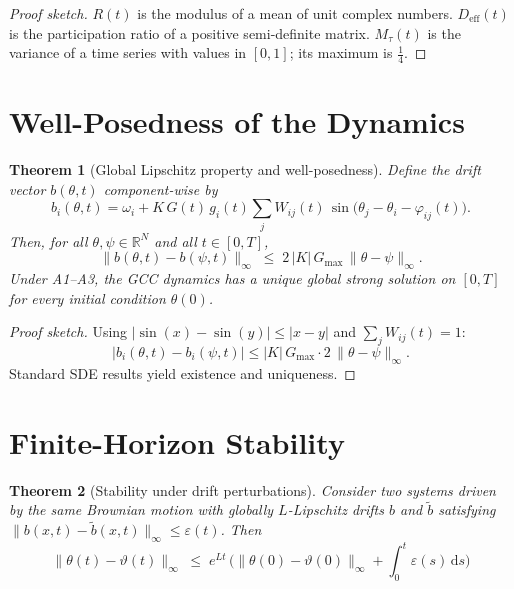\documentclass[11pt,a4paper]{article}
\theoremstyle{plain}
\newtheorem{theorem}{Theorem}[section]
\theoremstyle{definition}
\theoremstyle{remark}
\newcommand{\Deff}{D_{\mathrm{eff}}}
\newcommand{\Mtau}{M_{\tau}}
\newcommand{\Gmax}{G_{\max}}
\begin{document}
\begin{proof}[Proof sketch]
$R(t)$ is the modulus of a mean of unit complex numbers. $\Deff(t)$ is the participation ratio of a positive semi-definite matrix. $\Mtau(t)$ is the variance of a time series with values in $[0,1]$; its maximum is $\frac{1}{4}$.
\end{proof}

\section{Well-Posedness of the Dynamics}

\begin{theorem}[Global Lipschitz property and well-posedness]
\label{satz:lipschitz}
Define the drift vector $b(\theta,t)$ component-wise by
\begin{equation}
b_i(\theta,t) = \omega_i + K\,G(t)\,g_i(t)\sum_j W_{ij}(t)\,\sin\!\bigl(\theta_j - \theta_i - \varphi_{ij}(t)\bigr).
\end{equation}
Then, for all $\theta,\psi \in \mathbb{R}^N$ and all $t \in [0,T]$,
\begin{equation}
\label{eq:lipschitz}
\|b(\theta,t) - b(\psi,t)\|_{\infty} \;\leq\; 2\,|K|\,\Gmax\,\|\theta - \psi\|_{\infty}.
\end{equation}
Under \textup{A1--A3}, the GCC dynamics has a unique global strong solution on $[0,T]$ for every initial condition $\theta(0)$.
\end{theorem}

\begin{proof}[Proof sketch]
Using $|\sin(x) - \sin(y)| \leq |x - y|$ and $\sum_j W_{ij}(t) = 1$:
\begin{equation}
|b_i(\theta,t) - b_i(\psi,t)| \leq |K|\,\Gmax \cdot 2\,\|\theta - \psi\|_{\infty}.
\end{equation}
Standard SDE results yield existence and uniqueness.
\end{proof}

\section{Finite-Horizon Stability}

\begin{theorem}[Stability under drift perturbations]
\label{satz:stabilitaet}
Consider two systems driven by the same Brownian motion with globally $L$-Lipschitz drifts $b$ and $\tilde{b}$ satisfying $\|b(x,t) - \tilde{b}(x,t)\|_{\infty} \leq \varepsilon(t)$. Then
\begin{equation}
\label{eq:gronwall}
\|\theta(t) - \vartheta(t)\|_{\infty}
\;\leq\; e^{Lt}\,\biggl(\|\theta(0) - \vartheta(0)\|_{\infty} + \int_0^t \varepsilon(s)\,\mathrm{d}s\biggr)
\end{equation}
\end{theorem}
\end{document}
